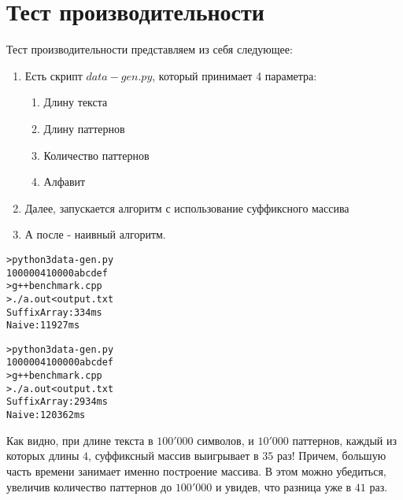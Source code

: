 \section{Тест производительности}


Тест производительности представляем из себя следующее:
\begin{enumerate}
    \item Есть скрипт $data-gen.py$, который принимает 4 параметра:
    \begin{enumerate}
        \item Длину текста
        \item Длину паттернов
        \item Количество паттернов
        \item Алфавит
    \end{enumerate}
    \item Далее, запускается алгоритм с использование суффиксного массива
    \item А после - наивный алгоритм.
\end{enumerate}

\begin{alltt}
> python3 data-gen.py
100000 4 10000 abcdef
> g++ benchmark.cpp
> ./a.out < output.txt
SuffixArray: 334 ms
Naive: 11927 ms

> python3 data-gen.py
100000 4 100000 abcdef
> g++ benchmark.cpp
> ./a.out < output.txt
SuffixArray: 2934 ms
Naive: 120362 ms
\end{alltt}

Как видно, при длине текста в $100'000$ символов, и $10'000$ паттернов, каждый из которых длины $4$, суффиксный массив выигрывает в $35$ раз! Причем, большую часть времени занимает именно построение массива. В этом можно убедиться, увеличив количество паттернов до $100'000$ и увидев, что разница уже в $41$ раз.


\pagebreak

